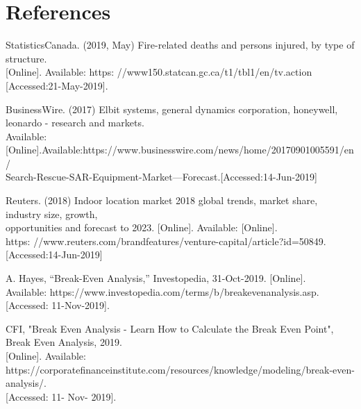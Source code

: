 

\setcounter{section}{3}
\section{References}

\bigskip

\begin{enumerate}[label={[\arabic*]}, leftmargin=*]
\item StatisticsCanada. (2019, May) Fire-related deaths and persons injured, by type of structure. \\
    {[Online]}. Available: https: //www150.statcan.gc.ca/t1/tbl1/en/tv.action \\
    {[Accessed:21-May-2019]}. \\

\item  BusinessWire. (2017) Elbit systems, general dynamics corporation, honeywell, leonardo - research and markets. \\
Available: {[Online]}.Available:https://www.businesswire.com/news/home/20170901005591/en/\\
Search-Rescue-SAR-Equipment-Market---Forecast.{[Accessed:14-Jun-2019]} \\

\item  Reuters. (2018) Indoor location market 2018 global trends, market share, industry size, growth, \\
opportunities and forecast to 2023. {[Online]}. Available: {[Online]}.\\
https: //www.reuters.com/brandfeatures/venture-capital/article?id=50849.{[Accessed:14-Jun-2019]}\\

\item A. Hayes, “Break-Even Analysis,” Investopedia, 31-Oct-2019. {[Online]}. \\
Available: https://www.investopedia.com/terms/b/breakevenanalysis.asp. {[Accessed: 11-Nov-2019]}.\\

\item CFI, "Break Even Analysis - Learn How to Calculate the Break Even Point", Break Even Analysis, 2019.\\
{[Online]}. Available: \\
https://corporatefinanceinstitute.com/resources/knowledge/modeling/break-even-analysis/. \\
{[Accessed: 11- Nov- 2019]}.\\


\end{enumerate}
